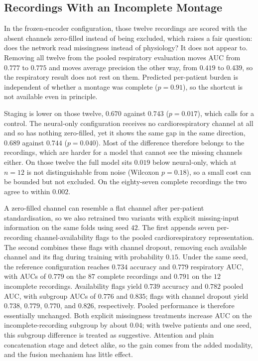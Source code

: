\documentclass{ieeeaccess}
\begin{document}
\subsection{Recordings With an Incomplete Montage}
In the frozen-encoder configuration, those twelve recordings are scored with the absent
channels zero-filled instead of being excluded, which raises a fair question: does the network read missingness instead of
physiology? It does not appear to. Removing all twelve from the pooled respiratory
evaluation moves AUC from $0.777$ to $0.775$ and moves average precision the other way,
from $0.419$ to $0.439$, so the respiratory result does not rest on them. Predicted
per-patient burden is independent of whether a montage was complete ($p=0.91$), so the
shortcut is not available even in principle.

Staging is lower on those twelve, $0.670$ against $0.743$ ($p=0.017$), which calls for a
control. The neural-only configuration receives no
cardiorespiratory channel at all and so has nothing zero-filled, yet it shows the same
gap in the same direction, $0.689$ against $0.744$ ($p=0.040$). Most of the difference
therefore belongs to the recordings, which are harder for a model that cannot see the
missing channels either. On those twelve the
full model sits $0.019$ below neural-only, which at $n=12$ is not distinguishable from
noise (Wilcoxon $p=0.18$), so a small cost can be bounded but not excluded. On the
eighty-seven complete recordings the two agree to within $0.002$.

A zero-filled channel can resemble a flat channel after per-patient standardisation, so we
also retrained two variants with explicit missing-input information on the same folds using
seed $42$. The first appends seven per-recording channel-availability flags to the pooled
cardiorespiratory representation. The second combines these flags with channel dropout,
removing each available channel and its flag during training with probability $0.15$. Under
the same seed, the reference configuration reaches $0.734$ accuracy and $0.779$ respiratory
AUC, with AUCs of $0.779$ on the $87$ complete recordings and $0.791$ on the $12$ incomplete
recordings. Availability flags yield $0.739$ accuracy and $0.782$ pooled AUC, with subgroup
AUCs of $0.776$ and $0.835$; flags with channel dropout yield $0.738$, $0.779$, $0.770$, and
$0.826$, respectively. Pooled performance is therefore essentially unchanged. Both explicit
missingness treatments increase AUC on the incomplete-recording subgroup by about $0.04$;
with twelve patients and one seed, this subgroup difference is treated as suggestive.
Attention and plain concatenation stage and detect alike, so the gain comes from the added
modality, and the fusion mechanism has little effect.
\end{document}
